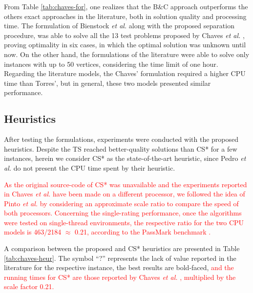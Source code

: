 \documentclass{ro}
\begin{document}
From Table \ref{tab:chaves-for}, one realizes that the B\&C approach outperforms the others exact approaches in the literature, both in solution quality and processing time. The formulation of Bienstock \textit{et al.} \cite{bienstock1993note} along with the proposed separation procedure, was able to solve all the 13 test problems proposed by Chaves \textit{et al.} \cite{chaves2005hybrid}, proving optimality in six cases, in which the optimal solution was unknown until now. On the other hand, the formulations of the literature were able to solve only instances with up to 50 vertices, considering the time limit of one hour. Regarding the literature models, the Chaves' formulation required a higher CPU time than Torres', but in general, these two models presented similar performance.



\subsection{Heuristics}

After testing the formulations, experiments were conducted with the proposed heuristics. Despite the TS reached better-quality solutions than CS* for a few instances, herein we consider CS* as the state-of-the-art heuristic, since Pedro \textit{et al.} \cite{pedro2013tabu} do not present the CPU time spent by their heuristic.




\textcolor{red}{As the original source-code of CS* was unavailable and the experiments reported in Chaves \textit{et al.}\cite{chaves2005hybrid} have been made on a different processor, we followed the idea of Pinto \textit{et al.} \cite{PINTO2018849} by considering an approximate scale ratio to compare the speed of both
processors. Concerning the single-rating performance, once the algorithms were tested on single-thread environments, the respective ratio for the two CPU models is 463/2184 $\approx$ 0.21, according to the PassMark benchmark \cite{passmark}.}

A comparison between the proposed and CS* heuristics are presented in Table  \ref{tab:chaves-heur}. The symbol ``?'' represents the lack of value reported in the literature for the respective instance,  the best results are bold-faced, \textcolor{red}{and the running times for CS* are those reported by Chaves \textit{et al.} \cite{chaves2005hybrid}, multiplied by the scale factor 0.21.}
\end{document}
